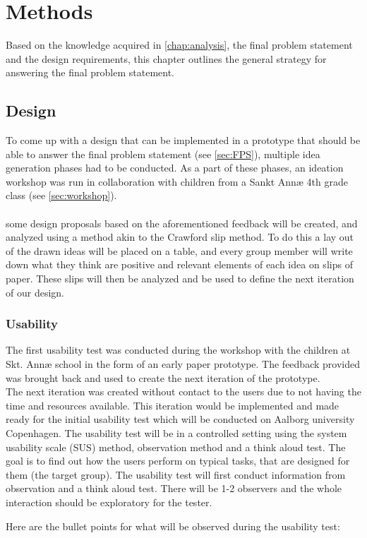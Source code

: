 \chapter{Methods}\label{chap:methods}
Based on the knowledge acquired in \autoref{chap:analysis}, the final problem statement and the design requirements, this chapter outlines the general strategy for answering the final problem statement.
\section{Design}\label{designMethod}
To come up with a design that can be implemented in a prototype that should be able to answer the final problem statement (see \autoref{sec:FPS}), multiple idea generation phases had to be conducted. As a part of these phases, an ideation workshop was run in collaboration with children from a Sankt Annæ 4th grade class (see \autoref{sec:workshop}).\\\\
some design proposals based on the aforementioned feedback will be created, and analyzed using a method akin to the Crawford slip method\cite{crawfordSlip}. To do this a lay out of the drawn ideas will be placed on a table, and every group member will write down what they think are positive and relevant elements of each idea on slips of paper. These slips will then be analyzed and be used to define the next iteration of our design.

\subsection{Usability}
The first usability test was conducted during the workshop with the children at Skt. Annæ school in the form of an early paper prototype. The feedback provided was brought back and used to create the next iteration of the prototype. \\
The next iteration was created without contact to the users due to not having the time and resources available. This iteration would be implemented and made ready for the initial usability test which will be conducted on Aalborg university Copenhagen.
The usability test will be in a controlled setting using the system usability scale (SUS) method, observation method and a think aloud test. The goal is to find out how the users perform on typical tasks, that are designed for them (the target group). 
The usability test will first conduct information from observation and a think aloud test. There will be 1-2 observers and the whole interaction should be exploratory for the tester. \par
Here are the bullet points for what will be observed during the usability test:\par

